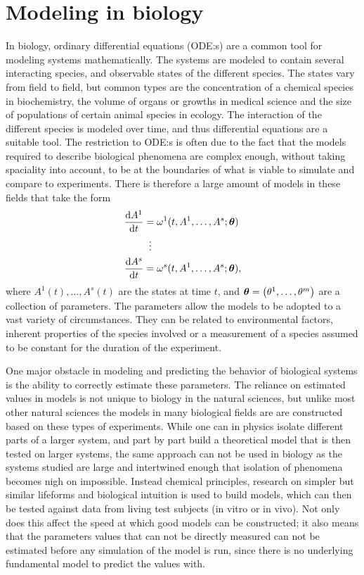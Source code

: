 \chapter{Modeling in biology} \label{ch:models}

In biology, ordinary differential equations (ODE:s) are a common tool for modeling systems mathematically.
The systems are modeled to contain several interacting species, and observable states of the different species.
The states vary from field to field, but common types are the concentration of a chemical species in biochemistry, the volume of organs or growths in medical science and the size of populations of certain animal species in ecology.
The interaction of the different species is modeled over time, and thus differential equations are a suitable tool.
The restriction to ODE:s is often due to the fact that the models required to describe biological phenomena are complex enough, without taking spaciality into account, to be at the boundaries of what is viable to simulate and compare to experiments.
There is therefore a large amount of models in these fields that take the form
\begin{align*}
  \begin{split} %
    \diff{A^1}{t} &= \omega^1(t, A^1, \dots, A^s; \vect{\theta}) \\
    &\equalsvdots \\
    \diff{A^s}{t} &= \omega^s(t, A^1, \dots, A^s; \vect{\theta}),
  \end{split}
\end{align*}
where \(A^1(t), \dots, A^s(t)\) are the states at time \(t\), and \(\vect{\theta} = \left(\theta^1, \dots, \theta^m\right)\) are a collection of parameters.
The parameters allow the models to be adopted to a vast variety of circumstances.
They can be related to environmental factors, inherent properties of the species involved or a measurement of a species assumed to be constant for the duration of the experiment.

One major obstacle in modeling and predicting the behavior of biological systems is the ability to correctly estimate these parameters.
The reliance on estimated values in models is not unique to biology in the natural sciences, but unlike most other natural sciences the models in many biological fields are are constructed based on these types of experiments.
While one can in physics isolate different parts of a larger system, and part by part build a theoretical model that is then tested on larger systems, the same approach can not be used in biology as the systems studied are large and intertwined enough that isolation of phenomena becomes nigh on impossible.
Instead chemical principles, research on simpler but similar lifeforms and biological intuition is used to build models, which can then be tested against data from living test subjects (in vitro or in vivo).
Not only does this affect the speed at which good models can be constructed; it also means that the parameters values that can not be directly measured can not be estimated before any simulation of the model is run, since there is no underlying fundamental model to predict the values with.

